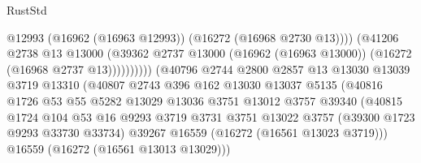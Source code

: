 \begin{lexlean}{RustStd}
\begin{coremodule}
                                              @12993
                                              (@16962 (@16963 @12993))
                                              (@16272 (@16968 @2730 @13))))
                                          (@41206
                                            @2738
                                            @13
                                            @13000
                                            (@39362
                                              @2737
                                              @13000
                                              (@16962 (@16963 @13000))
                                              (@16272 (@16968 @2737 @13))))))))))
                              (@40796
                                @2744
                                @2800
                                @2857
                                @13
                                @13030
                                @13039
                                @3719
                                @13310
                                (@40807
                                  @2743
                                  @396
                                  @162
                                  @13030
                                  @13037
                                  @5135
                                  (@40816
                                    @1726
                                    @53
                                    @55
                                    @5282
                                    @13029
                                    @13036
                                    @3751
                                    @13012
                                    @3757
                                    @39340
                                    (@40815
                                      @1724
                                      @104
                                      @53
                                      @16
                                      @9293
                                      @3719
                                      @3731
                                      @3751
                                      @13022
                                      @3757
                                      (@39300 @1723 @9293 @33730 @33734)
                                      @39267
                                      @16559
                                      (@16272 (@16561 @13023 @3719)))
                                    @16559
                                    (@16272 (@16561 @13013 @13029)))

\end{coremodule}
\end{lexlean}

